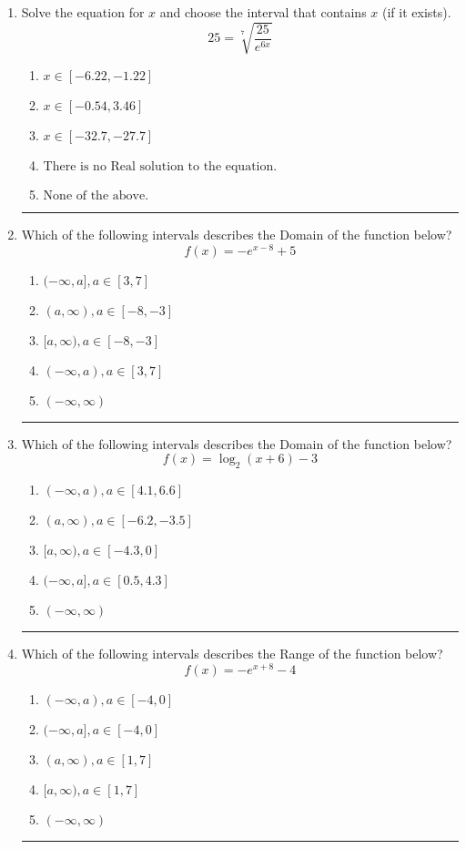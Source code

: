 \documentclass[14pt]{extbook}
\newcommand{\litem}[1]{\item#1\hspace*{-1cm}\rule{\textwidth}{0.4pt}}
\begin{document}
\begin{enumerate}
\litem{
 Solve the equation for $x$ and choose the interval that contains $x$ (if it exists).\[  25 = \sqrt[7]{\frac{25}{e^{6x}}} \]\begin{enumerate}[label=\Alph*.]
\item \( x \in [-6.22, -1.22] \)
\item \( x \in [-0.54, 3.46] \)
\item \( x \in [-32.7, -27.7] \)
\item \( \text{There is no Real solution to the equation.} \)
\item \( \text{None of the above.} \)

\end{enumerate} }
\litem{
Which of the following intervals describes the Domain of the function below?\[ f(x) = -e^{x-8}+5 \]\begin{enumerate}[label=\Alph*.]
\item \( (-\infty, a], a \in [3, 7] \)
\item \( (a, \infty), a \in [-8, -3] \)
\item \( [a, \infty), a \in [-8, -3] \)
\item \( (-\infty, a), a \in [3, 7] \)
\item \( (-\infty, \infty) \)

\end{enumerate} }
\litem{
Which of the following intervals describes the Domain of the function below?\[ f(x) = \log_2{(x+6)}-3 \]\begin{enumerate}[label=\Alph*.]
\item \( (-\infty, a), a \in [4.1, 6.6] \)
\item \( (a, \infty), a \in [-6.2, -3.5] \)
\item \( [a, \infty), a \in [-4.3, 0] \)
\item \( (-\infty, a], a \in [0.5, 4.3] \)
\item \( (-\infty, \infty) \)

\end{enumerate} }
\litem{
Which of the following intervals describes the Range of the function below?\[ f(x) = -e^{x+8}-4 \]\begin{enumerate}[label=\Alph*.]
\item \( (-\infty, a), a \in [-4, 0] \)
\item \( (-\infty, a], a \in [-4, 0] \)
\item \( (a, \infty), a \in [1, 7] \)
\item \( [a, \infty), a \in [1, 7] \)
\item \( (-\infty, \infty) \)


\end{enumerate}}
\end{enumerate}
\end{document}
